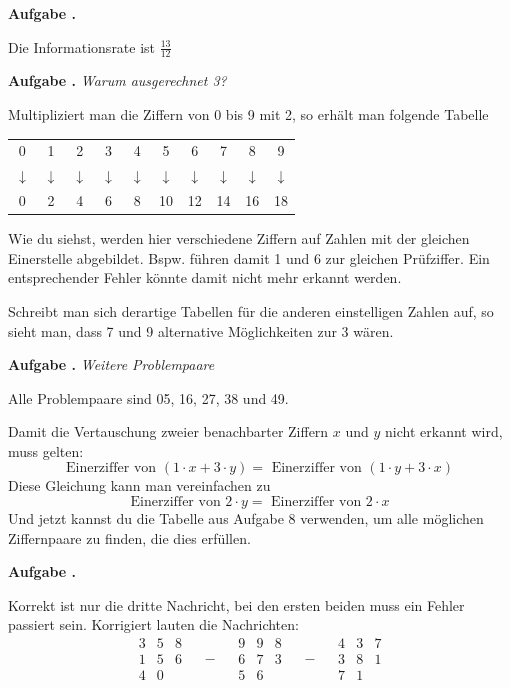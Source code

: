 \documentclass[a4paper,ngerman,12pt]{scrartcl}
\theoremstyle{definition}
\theoremstyle{plain}
\theoremstyle{remark}
\newlength{\aufgabenskip}
\newcounter{aufgabennummer}
\newenvironment{aufgabe}[1]{
	\addtocounter{aufgabennummer}{1}
	\textbf{Aufgabe \theaufgabennummer.} \emph{#1} \par
}{\vspace{\aufgabenskip}}
\begin{document}
\begin{aufgabe}{}
	Die Informationsrate ist $\frac{13}{12}$
\end{aufgabe}

\begin{aufgabe}{Warum ausgerechnet 3?}
	Multipliziert man die Ziffern von 0 bis 9 mit 2, so erhält man folgende Tabelle
	\begin{center}
		\begin{tabular}{cccccccccc}
			0 & 1 & 2 & 3 & 4 & 5 & 6 & 7 & 8 & 9 \\
			$\downarrow$ & $\downarrow$ & $\downarrow$ & $\downarrow$ & $\downarrow$ & $\downarrow$ & $\downarrow$ & $\downarrow$ & $\downarrow$ & $\downarrow$ \\
			0 & 2 & 4 & 6 & 8 & 10 & 12 & 14 & 16 & 18
		\end{tabular}
	\end{center}
	Wie du siehst, werden hier verschiedene Ziffern auf Zahlen mit der gleichen Einerstelle abgebildet. Bspw. führen damit 1 und 6 zur gleichen Prüfziffer. Ein entsprechender Fehler könnte damit nicht mehr erkannt werden.
	
	Schreibt man sich derartige Tabellen für die anderen einstelligen Zahlen auf, so sieht man, dass 7 und 9 alternative Möglichkeiten zur 3 wären.
\end{aufgabe}

\begin{aufgabe}{Weitere Problempaare}
	Alle Problempaare sind 05, 16, 27, 38 und 49.
	
	Damit die Vertauschung zweier benachbarter Ziffern $x$ und $y$ nicht erkannt wird, muss gelten: 
		\[\text{Einerziffer von }(1\cdot x + 3\cdot y) = \text{ Einerziffer von }(1\cdot y + 3\cdot x)\]
	Diese Gleichung kann man vereinfachen zu 
		\[\text{Einerziffer von }2\cdot y = \text{ Einerziffer von }2\cdot x\]
	Und jetzt kannst du die Tabelle aus Aufgabe 8 verwenden, um alle möglichen Ziffernpaare zu finden, die dies erfüllen.
\end{aufgabe}

\begin{aufgabe}{}
	Korrekt ist nur die dritte Nachricht, bei den ersten beiden muss ein Fehler passiert sein. Korrigiert lauten die Nachrichten:
	\[\begin{array}{ccc}3 & 5 & 8\\1 & 5 & 6 \\ 4 & 0 &\end{array} \quad-\quad \begin{array}{ccc}9 & 9 & 8\\6 & 7 & 3 \\ 5 & 6 &\end{array} \quad-\quad \begin{array}{ccc}4 & 3 & 7\\3 & 8 & 1 \\ 7 & 1 &\end{array}\]
\end{aufgabe}
\end{document}
